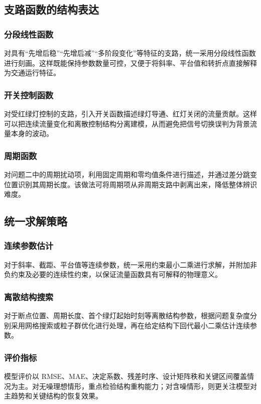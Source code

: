 \documentclass[UTF8,a4paper,fontset=none]{ctexart}
\numberwithin{equation}{section}
\begin{document}
\subsection{支路函数的结构表达}
\subsubsection{分段线性函数}
对具有``先增后稳”``先增后减”``多阶段变化”等特征的支路，统一采用分段线性函数进行刻画。这样既能保持参数数量可控，又便于将斜率、平台值和转折点直接解释为交通运行特征。

\subsubsection{开关控制函数}
对受红绿灯控制的支路，引入开关函数描述绿灯导通、红灯关闭的流量贡献。这样可以把连续流量变化和离散控制结构分离建模，从而避免把信号切换误判为背景流量本身的波动。

\subsubsection{周期函数}
对问题二中的周期扰动项，利用固定周期和零均值条件进行描述，并通过差分跳变位置识别其周期长度。该做法可将周期项从非周期支路中剥离出来，降低整体辨识难度。

\subsection{统一求解策略}
\subsubsection{连续参数估计}
对于斜率、截距、平台值等连续参数，统一采用约束最小二乘进行求解，并附加非负约束及必要的连续性约束，以保证流量函数具有可解释的物理意义。

\subsubsection{离散结构搜索}
对于断点位置、周期长度、首个绿灯起始时刻等离散结构参数，根据问题复杂度分别采用网格搜索或粒子群优化进行处理，再在给定结构下回代最小二乘估计连续参数。

\subsubsection{评价指标}
模型评价以 RMSE、MAE、决定系数、残差时序、设计矩阵秩和关键区间覆盖情况为主。对无噪理想情形，重点检验结构重构能力；对含噪情形，则更关注模型对主趋势和关键结构的恢复效果。
\end{document}
